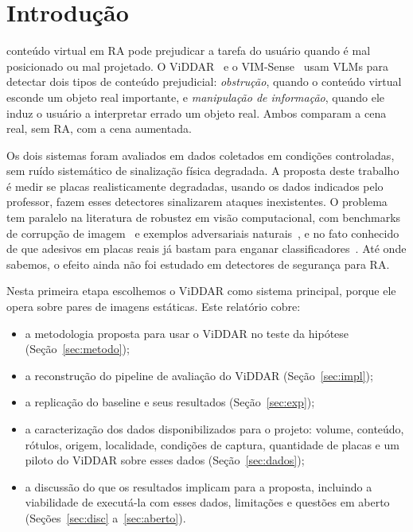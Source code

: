 \documentclass[journal,onecolumn]{IEEEtran}
\begin{document}
\IEEEpeerreviewmaketitle

\section{Introdução}

 conteúdo virtual em RA pode prejudicar a tarefa do usuário quando é mal posicionado
ou mal projetado. O ViDDAR~\cite{viddar} e o VIM-Sense~\cite{vimsense} usam VLMs para detectar dois
tipos de conteúdo prejudicial: \emph{obstrução}, quando o conteúdo virtual esconde um objeto real
importante, e \emph{manipulação de informação}, quando ele induz o usuário a interpretar errado um
objeto real. Ambos comparam a cena real, sem RA, com a cena aumentada.

Os dois sistemas foram avaliados em dados coletados em condições controladas, sem ruído sistemático de
sinalização física degradada. A proposta deste trabalho é medir se placas realisticamente degradadas,
usando os dados indicados pelo professor, fazem esses detectores sinalizarem
ataques inexistentes. O problema tem paralelo na literatura de robustez em visão computacional, com
benchmarks de corrupção de imagem~\cite{hendrycks2019} e exemplos adversariais
naturais~\cite{hendrycks2021}, e no fato conhecido de que adesivos em placas reais já bastam para
enganar classificadores~\cite{eykholt2018}. Até onde sabemos, o efeito ainda não foi estudado em
detectores de segurança para RA.

Nesta primeira etapa escolhemos o ViDDAR como sistema principal, porque ele opera sobre pares de
imagens estáticas. Este relatório cobre:
\begin{itemize}
\item a metodologia proposta para usar o ViDDAR no teste da hipótese (Seção~\ref{sec:metodo});
\item a reconstrução do pipeline de avaliação do ViDDAR (Seção~\ref{sec:impl});
\item a replicação do baseline e seus resultados (Seção~\ref{sec:exp});
\item a caracterização dos dados disponibilizados para o projeto: volume,
  conteúdo, rótulos, origem, localidade, condições de captura, quantidade de placas e um piloto do
  ViDDAR sobre esses dados (Seção~\ref{sec:dados});
\item a discussão do que os resultados implicam para a proposta, incluindo a viabilidade de
  executá-la com esses dados, limitações e questões em aberto (Seções~\ref{sec:disc}
  a~\ref{sec:aberto}).
\end{itemize}
\end{document}
